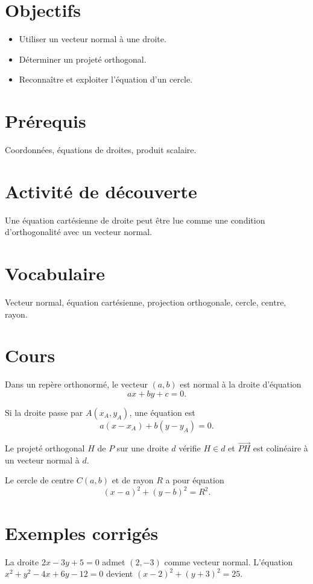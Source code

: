 \section{Objectifs}
\begin{itemize}
\item Utiliser un vecteur normal à une droite.
\item Déterminer un projeté orthogonal.
\item Reconnaître et exploiter l’équation d’un cercle.
\end{itemize}

\section{Prérequis}
Coordonnées, équations de droites, produit scalaire.

\section{Activité de découverte}
Une équation cartésienne de droite peut être lue comme une condition d’orthogonalité avec un vecteur normal.

\section{Vocabulaire}
Vecteur normal, équation cartésienne, projection orthogonale, cercle, centre, rayon.

\section{Cours}
Dans un repère orthonormé, le vecteur $(a,b)$ est normal à la droite d’équation
\[
ax+by+c=0.
\]

Si la droite passe par $A(x_A,y_A)$, une équation est
\[
a(x-x_A)+b(y-y_A)=0.
\]

Le projeté orthogonal $H$ de $P$ sur une droite $d$ vérifie $H\in d$ et $\overrightarrow{PH}$ est colinéaire à un vecteur normal à $d$.

Le cercle de centre $C(a,b)$ et de rayon $R$ a pour équation
\[
(x-a)^2+(y-b)^2=R^2.
\]

\section{Exemples corrigés}
La droite $2x-3y+5=0$ admet $(2,-3)$ comme vecteur normal.
L’équation $x^2+y^2-4x+6y-12=0$ devient $(x-2)^2+(y+3)^2=25$.

